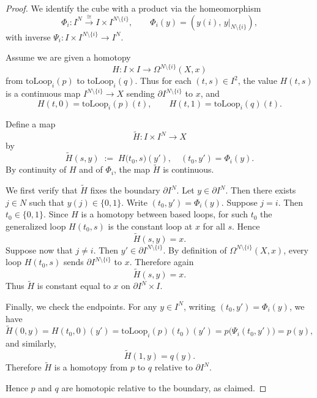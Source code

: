 \documentclass{article}
\begin{document}
\begin{proof}
We identify the cube with a product via the homeomorphism
\[
\Phi_i : I^{N} \xrightarrow{\ \cong\ } I \times I^{N\setminus\{i\}},
\qquad
\Phi_i(y) = (y(i),\, y|_{N\setminus\{i\}}),
\]
with inverse $\Psi_i : I\times I^{N\setminus\{i\}}\to I^{N}$.

Assume we are given a homotopy
\[
H : I\times I \longrightarrow \Omega^{N\setminus\{i\}}(X,x)
\]
from $\mathrm{toLoop}_i(p)$ to $\mathrm{toLoop}_i(q)$.
Thus for each $(t,s)\in I^2$, the value $H(t,s)$ is a continuous map
$I^{N\setminus\{i\}}\to X$ sending $\partial I^{N\setminus\{i\}}$ to $x$, and
\[
H(t,0)=\mathrm{toLoop}_i(p)(t),
\qquad
H(t,1)=\mathrm{toLoop}_i(q)(t).
\]

Define a map
\[
\widetilde H : I\times I^{N} \longrightarrow X
\]
by
\[
\widetilde H(s,y)
\;:=\;
H\bigl(t_0,s\bigr)(y'),
\quad (t_0,y')=\Phi_i(y).
\]
By continuity of $H$ and of $\Phi_i$, the map $\widetilde H$ is continuous.

We first verify that $\widetilde H$ fixes the boundary $\partial I^{N}$.
Let $y\in\partial I^{N}$.
Then there exists $j\in N$ such that $y(j)\in\{0,1\}$.
Write $(t_0,y')=\Phi_i(y)$.
Suppose  $j=i$. Then $t_0\in\{0,1\}$. Since $H$ is a homotopy between based loops, for such $t_0$ the generalized loop
$H(t_0,s)$ is the constant loop at $x$ for all $s$.
Hence
\[
\widetilde H(s,y)=x.
\]
Suppose now that $j\neq i$. Then $y'\in\partial I^{N\setminus\{i\}}$.
By definition of $\Omega^{N\setminus\{i\}}(X,x)$, every loop
$H(t_0,s)$ sends $\partial I^{N\setminus\{i\}}$ to $x$.
Therefore again
\[
\widetilde H(s,y)=x.
\]
Thus $\widetilde H$ is constant equal to $x$ on $\partial I^{N}\times I$.

Finally, we check the endpoints.
For any $y\in I^{N}$, writing $(t_0,y')=\Phi_i(y)$, we have
\[
\widetilde H(0,y)
=
H(t_0,0)(y')
=
\mathrm{toLoop}_i(p)(t_0)(y')
=
p\bigl(\Psi_i(t_0,y')\bigr)
=
p(y),
\]
and similarly,
\[
\widetilde H(1,y)=q(y).
\]
Therefore $\widetilde H$ is a homotopy from $p$ to $q$ relative to $\partial I^{N}$.

Hence $p$ and $q$ are homotopic relative to the boundary, as claimed.
\end{proof}
\end{document}
